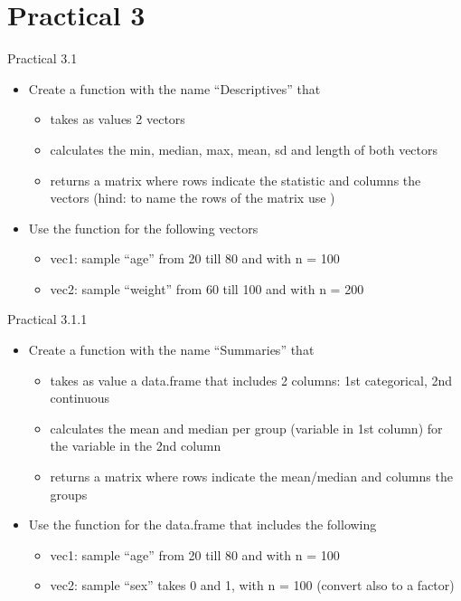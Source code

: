 \documentclass[14pt, aspectratio=169, sectionpage=simple, xclolor=table]{beamer}
\begin{document}
\section{Practical 3}
\begin{frame}{Practical 3.1}
\begin{itemize}
\item Create a function with the name \enquote{Descriptives} that
\begin{itemize}
\item takes as values 2 vectors
\item calculates the min, median, max, mean, sd and length of both vectors
\item returns a matrix where rows indicate the statistic and columns the vectors (hind: to name the rows of the matrix use )
\end{itemize}
\item Use the function for the following vectors
\begin{itemize}
\item vec1: sample \enquote{age} from 20 till 80 and with n = 100
\item vec2: sample \enquote{weight} from 60 till 100 and with n = 200
\end{itemize}
\end{itemize}
\end{frame}
\begin{frame}{Practical 3.1.1 }
\begin{itemize}
\item Create a function with the name \enquote{Summaries} that
\begin{itemize}
\item takes as value a data.frame that includes 2 columns: 1st categorical, 2nd continuous
\item calculates the mean and median per group (variable in 1st column) for the variable in the 2nd column
\item returns a matrix where rows indicate the mean/median and columns the groups
\end{itemize}
\item Use the function for the data.frame that includes the following
\begin{itemize}
\item vec1: sample \enquote{age} from 20 till 80 and with n = 100
\item vec2: sample \enquote{sex} takes 0 and 1, with n = 100 (convert also to a factor)
\end{itemize}
\end{itemize}
\end{frame}
\end{document}

